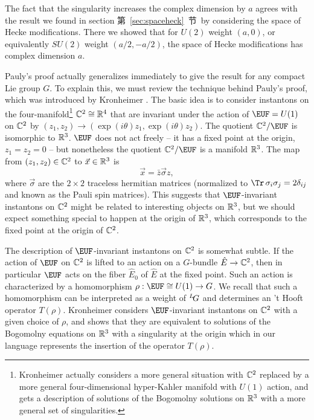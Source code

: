The fact that the singularity increases the complex dimension by
$a$ agrees with the result we found in section 第~\ref{sec:spaceheck}~节\ by
considering the space of Hecke modifications. There we showed that
for $U(2)$ weight $(a,0)$, or equivalently $SU(2)$ weight
$(a/2,-a/2)$, the space of Hecke modifications has complex
dimension $a$.

Pauly's proof actually generalizes immediately to give the result
for any compact Lie group $G$.  To explain this, we must review
the technique behind Pauly's proof, which was introduced by
Kronheimer \cite{ref110}. The basic idea is to consider
instantons on the four-manifold\footnote{Kronheimer actually considers
a more general situation with $\Bbb{C}^2$ replaced by a more
general four-dimensional hyper-Kahler manifold with $U(1)$ action,
and gets a description of solutions of the Bogomolny solutions on
$\Bbb{R}^3$ with a more general set of singularities.}
 $\Bbb{C}^2\cong \Bbb{R}^4$ that are invariant under the action of ${\EUF}=U(1)$ on
$\Bbb{C}^2$ by $(z_1,z_2)\to (\exp(i\theta)z_1,\exp(i\theta)z_2)$.
The quotient $\Bbb{C}^2/{\EUF}$ is isomorphic to $\Bbb{R}^3$.
${\EUF}$ does not act  freely -- it has a fixed point at the
origin, $z_1=z_2=0$ -- but nonetheless the quotient
$\Bbb{C}^2/{\EUF}$ is a manifold $\Bbb{R}^3$.  The map from
$(z_1,z_2)\in \Bbb{C}^2$ to $\vec x\in \Bbb{R}^3$ is
\setcounter{equation}{2}
\begin{equation}\label{eq:nigo}
\vec x=\bar z\vec\sigma z,
\end{equation}
 where $\vec\sigma$ are the
$2\times 2$ traceless hermitian matrices (normalized to $\Tr
\,\sigma_i\sigma_j=2\delta_{ij}$ and known as the Pauli spin
matrices).  This suggests that ${\EUF}$-invariant instantons on
$\Bbb{C}^2$ might be related to interesting objects on
$\Bbb{R}^3$, but we should expect something special to happen at
the origin of $\Bbb{R}^3$, which corresponds to the fixed point at
the origin of $\Bbb{C}^2$.

The description of ${\EUF}$-invariant instantons on $\Bbb{C}^2$ is
somewhat subtle. If the action of ${\EUF}$ on $\Bbb{C}^2$ is
lifted to an action on a $G$-bundle $\hat E\to \Bbb{C}^2$, then in
particular ${\EUF}$ acts on the fiber $\hat E_{0}$ of $\hat E$ at
the fixed point. Such an action is characterized by a homomorphism
$\rho:{\EUF}\cong U(1)\to G$. We recall that such a homomorphism
can be interpreted as a weight of $^L\negthinspace G$ and
determines an 't Hooft operator $T(\rho)$. Kronheimer considers
${\EUF}$-invariant instantons on $\Bbb{C}^2$  with a given choice
of $\rho$, and shows that they are equivalent to solutions of the
Bogomolny equations on $\Bbb{R}^3$ with a singularity at the
origin which in our language represents the insertion of the
operator $T(\rho)$.

